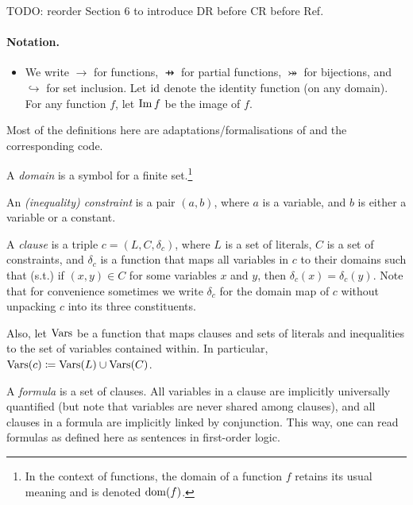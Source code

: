 TODO: reorder Section 6 to introduce DR before CR before Ref.

\paragraph{Notation.}
\begin{itemize}
\item We write $\to$ for functions, $\pfun$ for partial functions, $\twoheadrightarrowtail$ for bijections, and $\hookrightarrow$ for set inclusion. Let $\operatorname{id}$ denote the identity function (on any domain). For any function $f$, let $\operatorname{Im} f$ be the image of $f$.
\end{itemize}

Most of the definitions here are adaptations/formalisations of \cite{DBLP:conf/ijcai/BroeckTMDR11} and the corresponding code.

\begin{definition}
  A \emph{domain} is a symbol for a finite set.\footnote{In the context of functions, the domain of a function $f$ retains its usual meaning and is denoted $\operatorname{dom}(f)$.}
\end{definition}

\begin{definition}
  An \emph{(inequality) constraint} is a pair $(a, b)$, where $a$ is a variable, and $b$ is either a variable or a constant.
\end{definition}

\begin{definition}
  A \emph{clause} is a triple $c = (L, C, \delta_c)$, where $L$ is a set of literals, $C$ is a set of constraints, and $\delta_c$ is a function that maps all variables in $c$ to their domains such that (s.t.) if $(x, y) \in C$ for some variables $x$ and $y$, then $\delta_c(x) = \delta_c(y)$. Note that for convenience sometimes we write $\delta_c$ for the domain map of $c$ without unpacking $c$ into its three constituents.

  Also, let $\operatorname{Vars}$ be a function that maps clauses and sets of literals and inequalities to the set of variables contained within. In particular, $\operatorname{Vars}(c) \coloneqq \operatorname{Vars}(L) \cup \operatorname{Vars}(C)$.
\end{definition}

A \emph{formula} is a set of clauses. All variables in a clause are implicitly universally quantified (but note that variables are never shared among clauses), and all clauses in a formula are implicitly linked by conjunction. This way, one can read formulas as defined here as sentences in first-order logic.

